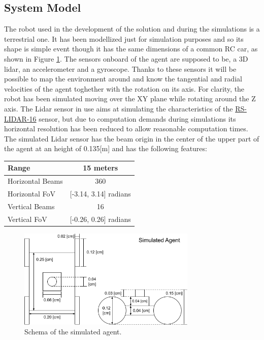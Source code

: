 \documentclass[twocolumn, a4paper]{article}
\begin{document}
\subsection{System Model}
The robot used in the development of the solution and during the simulations
is a terrestrial one. It has been modellized just for simulation purposes
and so its shape is simple event though it has the same dimensions of
a common RC car, as shown in Figure \ref{fig:Robot_dimensions}.
The sensors onboard of the agent are supposed to be, a 3D lidar, an
accelerometer and a gyroscope. Thanks to these sensors it will be possible
to map the environment around and know the tangential and radial velocities
of the agent toghether with the rotation on its axis.
For clarity, the robot has been simulated moving over the XY plane while
rotating around the Z axis.
The Lidar sensor in use aims at simulating the characteristics of the 
\href{https://www.robosense.ai/en/rslidar/RS-LiDAR-16}{RS-LIDAR-16} sensor,
but due to computation demands during simulations its horizontal resolution
has been reduced to allow reasonable computation times.
The simulated Lidar sensor has the beam origin in the center of the upper part
of the agent at an height of 0.135[m] and has the following features:

\begin{center}
\begin{tabular}{| l | c |}
    \hline
    Range & 15 meters \\
    \hline
    Horizontal Beams & 360 \\
    \hline
    Horizontal FoV & [-3.14, 3.14] radians \\
    \hline
    Vertical Beams & 16 \\
    \hline
    Vertical FoV & [-0.26, 0.26] radians \\
    \hline
\end{tabular}
\end{center}

\vspace{0.5cm}

\begin{figure}[h]
    \centering
    \includegraphics[width=8.5cm]{"../Report_images/Agent_schema"}
    \caption{Schema of the simulated agent.}
    \label{fig:Robot_dimensions}
\end{figure}
\end{document}

